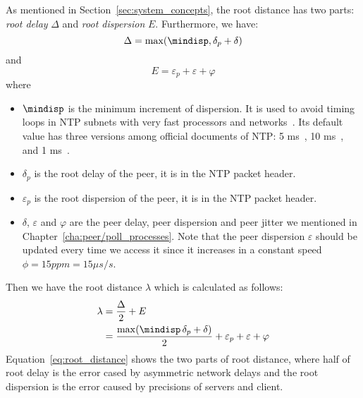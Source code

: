 As mentioned in Section~\ref{sec:system_concepts}, the root distance has two
parts: \emph{root delay} $\Delta$ and \emph{root dispersion} $E$. Furthermore, 
we have: 
\begin{equation}
    \Delta = \max(\mindisp, \delta_p + \delta)
    \label{eq:root_delay}
\end{equation}
and
\begin{equation}
    E = \varepsilon_p + \varepsilon + \varphi
    \label{eq:root_dispersion}
\end{equation}
where 
\begin{itemize}
    \item $\mindisp$ is the minimum increment of dispersion. It is used to
        avoid timing loops in NTP subnets with very fast processors and
        networks~\cite{rfc5905}. Its default value has three versions among
        official documents of NTP: 5 ms~\cite{rfc5905}, 10 ms~\cite{rfc5905},
        and 1 ms~\cite{performance_metrics}.
    \item $\delta_p$ is the root delay of the peer, it is in the NTP packet
        header.
    \item $\varepsilon_p$ is the root dispersion of the peer, it is in the NTP
        packet header.
    \item $\delta$, $\varepsilon$ and $\varphi$ are the peer delay, peer
        dispersion and peer jitter we mentioned in
        Chapter~\ref{cha:peer/poll_processes}. Note that the peer dispersion
        $\varepsilon$ should be updated every time we access it since it
        increases in a constant speed $\phi = 15 ppm = 15 \mu s/s$.
\end{itemize}
Then we have the root distance $\lambda$ which is calculated as follows:
\begin{align}
    \lambda & = \frac{\Delta}{2} + E\\
    & =\frac{\max(\mindisp\, \delta_p + \delta)}{2} 
    + \varepsilon_p + \varepsilon + \varphi
    \label{eq:root_distance}
\end{align}
Equation~\ref{eq:root_distance} shows the two parts of root distance, where
half of root delay is the error cased by asymmetric network delays and the
root dispersion is the error caused by precisions of servers and client.

